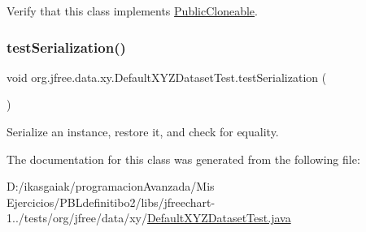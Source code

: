 Verify that this class implements \mbox{\hyperlink{}{Public\+Cloneable}}. \mbox{\label{classorg_1_1jfree_1_1data_1_1xy_1_1_default_x_y_z_dataset_test_a7ab6889be2dbc05fd53862ead7c65ace}} 
\subsubsection{\texorpdfstring{test\+Serialization()}{testSerialization()}}
{\footnotesize\ttfamily void org.\+jfree.\+data.\+xy.\+Default\+X\+Y\+Z\+Dataset\+Test.\+test\+Serialization (\begin{DoxyParamCaption}{ }\end{DoxyParamCaption})}

Serialize an instance, restore it, and check for equality. 

The documentation for this class was generated from the following file\+:\begin{DoxyCompactItemize}
\item 
D\+:/ikasgaiak/programacion\+Avanzada/\+Mis Ejercicios/\+P\+B\+Ldefinitibo2/libs/jfreechart-\/1../tests/org/jfree/data/xy/\mbox{\hyperlink{_default_x_y_z_dataset_test_8java}{Default\+X\+Y\+Z\+Dataset\+Test.\+java}}\end{DoxyCompactItemize}
